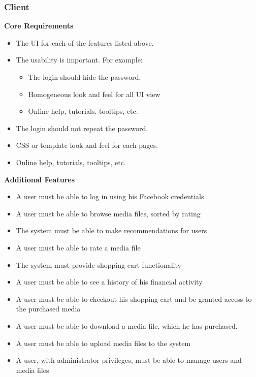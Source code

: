 \subsubsection{Client}
\textbf{Core Requirements}
\begin{itemize}
	\item The UI for each of the features listed above. 
	\item The usability is important. For example:
	\begin{itemize}
		\item The login should hide the password.
		\item Homogeneous look and feel for all UI view
		\item Online help, tutorials, tooltips, etc.
	\end{itemize}
	\item The login should not repeat the password.
	\item CSS or template look and feel for each pages.
	\item Online help, tutorials, tooltips, etc.
\end{itemize}
\textbf{Additional Features}
\begin{itemize}
	\item A user must be able to log in using his Facebook credentials
	\item A user must be able to browse media files, sorted by rating
	\item The system must be able to make recommendations for users 
	\item A user must be able to rate a media file
	\item The system must provide shopping cart functionality
	\item A user must be able to see a history of his financial activity
	\item A user must be able to checkout his shopping cart and be granted access to the purchased media
	\item A user must be able to download a media file, which he has purchased. 
	\item A user must be able to upload media files to the system
	\item A user, with administrator privileges, must be able to manage users and media files 
\end{itemize}

